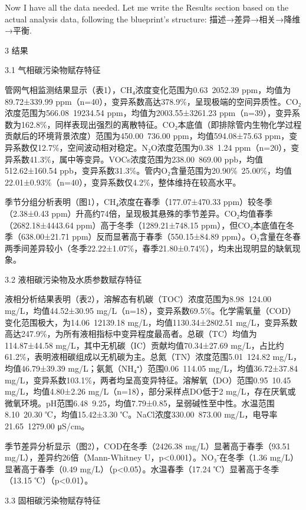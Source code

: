 Now I have all the data needed. Let me write the Results section based on the actual analysis data, following the blueprint's structure: 描述→差异→相关→降维→平衡.

3 结果

3.1 气相碳污染物赋存特征

管网气相监测结果显示（表1），CH₄浓度变化范围为0.63~2052.39 ppm，均值为89.72±339.99 ppm（n=40），变异系数高达378.9\%，呈现极端的空间异质性。CO₂浓度范围为566.08~19234.54 ppm，均值为2003.55±3261.23 ppm（n=39），变异系数为162.8\%，同样表现出强烈的离散特征。CO₂本底值（即排除管内生物化学过程贡献后的环境背景浓度）范围为450.00~736.00 ppm，均值594.08±75.63 ppm，变异系数仅12.7\%，空间波动相对稳定。N₂O浓度范围为0.38~1.24 ppm（n=20），变异系数41.3\%，属中等变异。VOCs浓度范围为238.00~869.00 ppb，均值512.62±160.54 ppb，变异系数31.3\%。管内O₂含量范围为20.90\%~25.00\%，均值22.01±0.93\%（n=40），变异系数仅4.2\%，整体维持在较高水平。

季节分组分析表明（图1），CH₄浓度在春季（177.07±470.33 ppm）较冬季（2.38±0.43 ppm）升高约74倍，呈现极其悬殊的季节差异。CO₂均值春季（2682.18±4443.64 ppm）高于冬季（1289.21±748.15 ppm），但CO₂本底值在冬季（638.00±21.71 ppm）反而显著高于春季（550.15±84.89 ppm）。O₂含量在冬春两季间差异较小（冬季22.22±1.07\%，春季21.80±0.74\%），均未出现明显的缺氧现象。

3.2 液相碳污染物及水质参数赋存特征

液相分析结果表明（表2），溶解态有机碳（TOC）浓度范围为8.98~124.00 mg/L，均值44.52±30.95 mg/L（n=18），变异系数69.5\%。化学需氧量（COD）变化范围极大，为14.06~12139.18 mg/L，均值1130.34±2802.51 mg/L，变异系数高达247.9\%，为所有液相指标中变异程度最高者。总碳（TC）均值为114.87±44.58 mg/L，其中无机碳（IC）贡献均值70.34±27.69 mg/L，占比约61.2\%，表明液相碳组成以无机碳为主。总氮（TN）浓度范围5.01~124.82 mg/L，均值46.79±39.39 mg/L；氨氮（NH₄⁺）范围0.06~114.05 mg/L，均值36.72±37.84 mg/L，变异系数103.1\%，两者均呈高变异特征。溶解氧（DO）范围0.95~10.45 mg/L，均值4.80±2.26 mg/L（n=18），部分采样点DO低于2 mg/L，存在厌氧或微氧环境。pH范围6.48~9.25，均值7.79±0.85，呈弱碱性至中性。水温范围8.10~20.30 ℃，均值15.42±3.30 ℃。NaCl浓度330.00~873.00 mg/L，电导率21.65~1279.00 μS/cm。

季节差异分析显示（图2），COD在冬季（2426.38 mg/L）显著高于春季（93.51 mg/L），差异约26倍（Mann-Whitney U，p<0.001）。NO₃⁻在冬季（1.36 mg/L）显著高于春季（0.49 mg/L）（p<0.05）。水温春季（17.24 ℃）显著高于冬季（13.15 ℃）（p<0.01）。

3.3 固相碳污染物赋存特征

